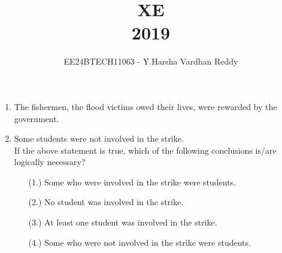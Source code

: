 \documentclass[journal]{IEEEtran}
\numberwithin{equation}{enumi}
\numberwithin{figure}{enumi}
\begin{document}

\vspace{3cm}

\title{XE\\2019}
\author{EE24BTECH11063 - Y.Harsha Vardhan Reddy}
\maketitle

\bigskip

\begin{enumerate}
\section*{Q.1 to Q.5 carry 1 mark each}
\item The fishermen, \underline{\hspace{2cm}} the flood victims owed their lives, were rewarded by the government.\\
\begin{enumerate}
\end{enumerate}

\bigskip

\item Some students were not involved in the strike.\\
If the above statement is true, which of the following conclusions is/are logically necessary?\\
\begin{enumerate}
    \item[(1.)] Some who were involved in the strike were students.
    \item[(2.)] No student was involved in the strike.
    \item[(3.)]  At least one student was involved in the strike.
    \item[(4.)] Some who were not involved in the strike were students.
\end{enumerate}
\begin{enumerate}
\end{enumerate}


\end{enumerate}
\end{document}
